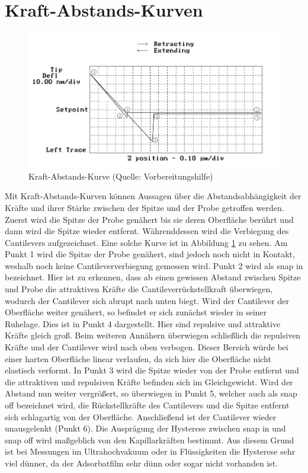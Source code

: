 \section{Kraft-Abstands-Kurven}
\begin{figure}[H]
    \centering
    \includegraphics[width=130mm,scale=0.7]{Rasterkraftmikroskop/include/Kraft-Abstands-Kurve.PNG}
    \caption{Kraft-Abstands-Kurve (Quelle: Vorbereitungshilfe)} 
    \label{fig:Kraft-Abstands-Kurve}
\end{figure}
Mit Kraft-Abstands-Kurven können Aussagen über die Abstandsabhängigkeit der Kräfte und ihrer Stärke zwischen der Spitze und der Probe getroffen werden. Zuerst wird die Spitze der Probe genähert bis sie deren Oberfläche berührt und dann wird die Spitze wieder entfernt. Währenddessen wird die Verbiegung des Cantilevers aufgezeichnet. Eine solche Kurve ist in Abbildung \ref{fig:Kraft-Abstands-Kurve} zu sehen. Am Punkt 1 wird die Spitze der Probe genähert, sind jedoch noch nicht in Kontakt, weshalb noch keine Cantileververbiegung gemessen wird. Punkt 2 wird als \glqq snap in\grqq{} bezeichnet. Hier ist zu erkennen, dass ab einen gewissen Abstand zwischen Spitze und Probe die attraktiven Kräfte die Cantileverrückstellkraft überwiegen, wodurch der Cantilever sich abrupt nach unten biegt. Wird der Cantilever der Oberfläche weiter genähert, so befindet er sich zunächst wieder in seiner Ruhelage. Dies ist in Punkt 4 dargestellt. Hier sind repulsive und attraktive Kräfte gleich groß. Beim weiteren Annähern überwiegen schließlich die repulsiven Kräfte und der Cantilever wird nach oben verbogen. Dieser Bereich würde bei einer harten Oberfläche linear verlaufen, da sich hier die Oberfläche nicht elastisch verformt. In Punkt 3 wird die Spitze wieder von der Probe entfernt und die attraktiven und repulsiven Kräfte befinden sich im Gleichgewicht. Wird der Abstand nun weiter vergrößert, so überwiegen in Punkt 5, welcher auch als \glqq snap off\grqq{} bezeichnet wird, die Rückstellkräfte des Cantilevers und die Spitze entfernt sich schlagartig von der Oberfläche. Anschließend ist der Cantilever wieder unausgelenkt (Punkt 6). Die Ausprägung der Hysterese zwischen snap in und snap off wird maßgeblich von den Kapillarkräften bestimmt. Aus diesem Grund ist bei Messungen im Ultrahochvakuum oder in Flüssigkeiten die Hysterese sehr viel dünner, da der Adsorbatfilm sehr dünn oder sogar nicht vorhanden ist. \\
